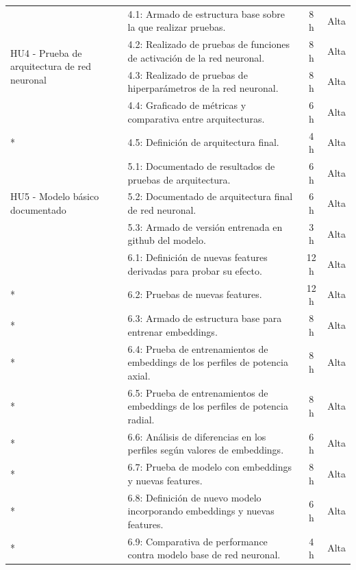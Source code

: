 \documentclass[
11pt, %
]{charter}
\begin{document}
\begin{longtable}{|p{4cm}|p{6cm}|c|c|}
\multirow{4}{4cm}{HU4 - Prueba de arquitectura de red neuronal} 
  & 4.1: Armado de estructura base sobre la que realizar pruebas. & 8 h & Alta \\* \cline{2-4}   
  & 4.2: Realizado de pruebas de funciones de activación de la red neuronal. & 8 h & Alta \\* \cline{2-4}
  & 4.3: Realizado de pruebas de hiperparámetros de la red neuronal. & 8 h & Alta \\* \cline{2-4}
  & 4.4: Graficado de métricas y comparativa entre arquitecturas. & 6 h & Alta \\* \cline{2-4}
  & 4.5: Definición de arquitectura final. & 4 h & Alta \\ \hline

\multirow{3}{4cm}{HU5 - Modelo básico documentado}  
  & 5.1: Documentado de resultados de pruebas de arquitectura. & 6 h & Alta \\* \cline{2-4}
  & 5.2: Documentado de arquitectura final de red neuronal. & 6 h & Alta \\* \cline{2-4}
  & 5.3: Armado de versión entrenada en github del modelo. & 3 h & Alta \\ \hline

\pagebreak

\multirow{8}{4cm}{HU6 - Feature engineering y embeddings}  
  & 6.1: Definición de nuevas features derivadas para probar su efecto. & 12 h & Alta \\* \cline{2-4}
  & 6.2: Pruebas de nuevas features. & 12 h & Alta \\* \cline{2-4}
  & 6.3: Armado de estructura base para entrenar embeddings. & 8 h & Alta \\* \cline{2-4}
  & 6.4: Prueba de entrenamientos de embeddings de los perfiles de potencia axial. & 8 h & Alta \\* \cline{2-4}
  & 6.5: Prueba de entrenamientos de embeddings de los perfiles de potencia radial. & 8 h & Alta \\* \cline{2-4}
  & 6.6: Análisis de diferencias en los perfiles según valores de embeddings. & 6 h & Alta \\* \cline{2-4}
  & 6.7: Prueba de modelo con embeddings y nuevas features. & 8 h & Alta \\* \cline{2-4}
  & 6.8: Definición de nuevo modelo incorporando embeddings y nuevas features. & 6 h & Alta \\* \cline{2-4}
  & 6.9: Comparativa de performance contra modelo base de red neuronal. & 4 h & Alta \\ \hline


\end{longtable}
\end{document}
